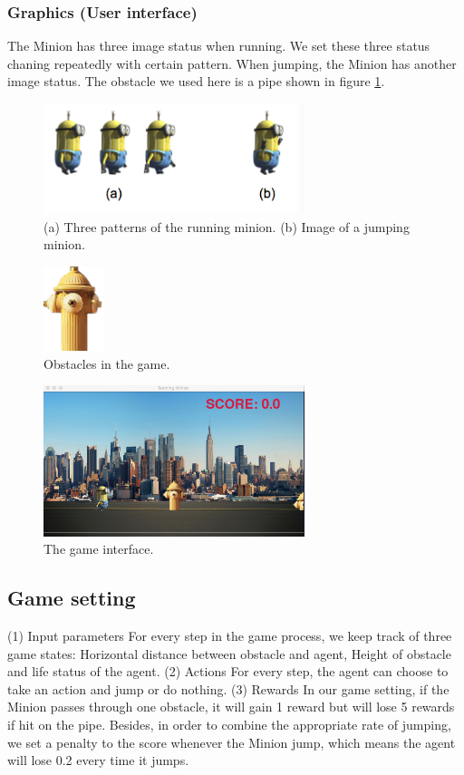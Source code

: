 \documentclass{acmsiggraph}
\begin{document}
\subsubsection{Graphics (User interface)}
The Minion has three image status when running. We set these three status chaning repeatedly with certain pattern. When jumping, the Minion has another image status. The obstacle we used here is a pipe shown in figure \ref{fig:minion}.


\begin{figure}[ht]
  \centering
  \includegraphics[width=3.0in]{../fig/minion.png}
  \caption{(a) Three patterns of the running minion. (b) Image of a jumping minion.}
  \label{fig:minion}
\end{figure}


\begin{figure}[ht]
  \centering
  \includegraphics[width=50pt]{../fig/obstacle.png}
  \caption{Obstacles in the game.}
  \label{fig:obstacle}
\end{figure}


\begin{figure}[ht]
  \centering
  \includegraphics[width=3.0in]{../fig/interface.jpg}
  \caption{The game interface.}
  \label{fig:interface}
\end{figure}

\subsection{Game setting}
(1) Input parameters
For every step in the game process, we keep track of three game states: Horizontal distance between obstacle and agent, Height of obstacle and life status of the agent.
(2) Actions
For every step, the agent can choose to take an action and jump or do nothing.
(3) Rewards
In our game setting, if the Minion passes through one obstacle, it will gain 1 reward but will lose 5 rewards if hit on the pipe. Besides, in order to combine the appropriate rate of jumping, we set a penalty to the score whenever the Minion jump, which means the agent will lose 0.2 every time it jumps. 
\end{document}
